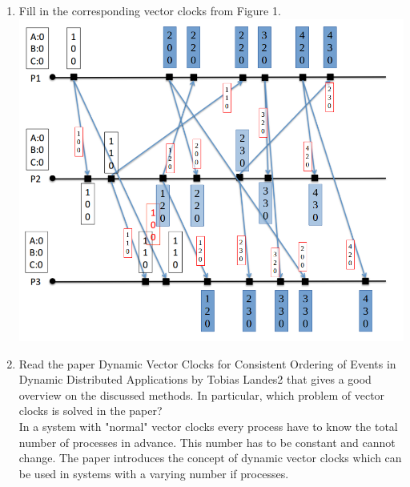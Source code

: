 \documentclass[11pt]{article}
\begin{document}
\begin{enumerate}
\item {Fill in the corresponding vector clocks from Figure 1.} \vspace{4pt}\\ 
\includegraphics[scale=0.4]{figure1_completed}
\item {Read the paper Dynamic Vector Clocks for Consistent Ordering of Events in Dynamic
Distributed Applications by Tobias Landes2
that gives a good overview on the discussed
methods. In particular, which problem of vector clocks is solved in the paper?} \vspace{4pt}\\ 
In a system with "normal" vector clocks every process have to know the total number of processes in advance. This number has to be constant and cannot change.
The paper introduces the concept of dynamic vector clocks which can be used in systems with a varying number if processes.


\end{enumerate}
\end{document}
